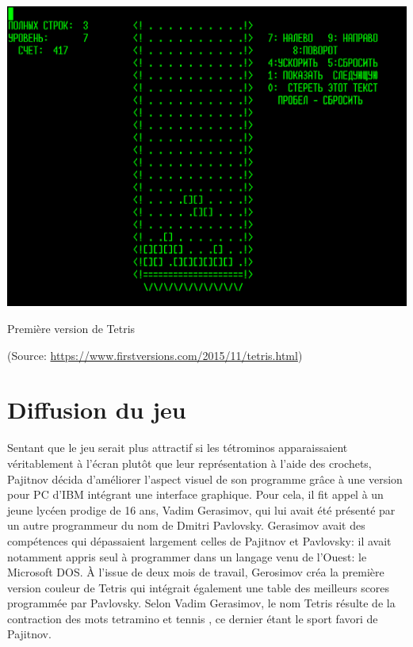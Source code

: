 \begin{center}
	\includegraphics[scale=0.8]{../media/premiere_version.png}
	
	Première version de Tetris 
	
	(Source: \url{https://www.firstversions.com/2015/11/tetris.html})
\end{center}

\section{Diffusion du jeu}

Sentant que le jeu serait plus attractif si les tétrominos apparaissaient \og véritablement \fg{} à l'écran plutôt que leur représentation à l'aide des crochets, Pajitnov décida d'améliorer l'aspect visuel de son programme grâce à une version pour PC d'IBM intégrant une interface graphique. Pour cela, il fit appel à un jeune lycéen prodige de 16 ans, Vadim Gerasimov, qui lui avait été présenté par un autre programmeur du nom de Dmitri Pavlovsky. Gerasimov avait des compétences qui dépassaient largement celles de Pajitnov et Pavlovsky: il avait notamment appris seul à programmer dans un langage venu de l'Ouest: le Microsoft DOS. \`A l'issue de deux mois de travail, Gerosimov créa la première version \og couleur \fg{} de Tetris qui intégrait également une table des meilleurs scores programmée par Pavlovsky.  Selon Vadim Gerasimov, le nom Tetris résulte de la contraction des mots \og tetramino \fg{} et \og tennis \fg{}, ce dernier étant le sport favori de Pajitnov.


